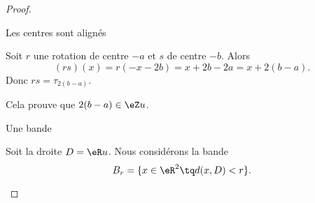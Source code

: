 \begin{proof}
\begin{subproof}
\begin{subproof}
                \item[Les centres sont alignés]

                    Soit \( r\) une rotation de centre \( -a\) et \( s\) de centre \( -b\). Alors
                    \begin{equation}
                        (rs)(x)=r(-x-2b)=x+2b-2a=x+2(b-a).
                    \end{equation}
                    Donc \( rs=\tau_{2(b-a)}\).

                    Cela prouve que \(2(b-a)\in \eZ u\).

                \item[Une bande]

                    Soit la droite \( D=\eR u\). Nous considérons la bande
                    \begin{equation}
                        B_r=\{ x\in \eR^2\tq d(x,D)<r \}.
                    \end{equation}


\end{subproof}
\end{subproof}
\end{proof}
